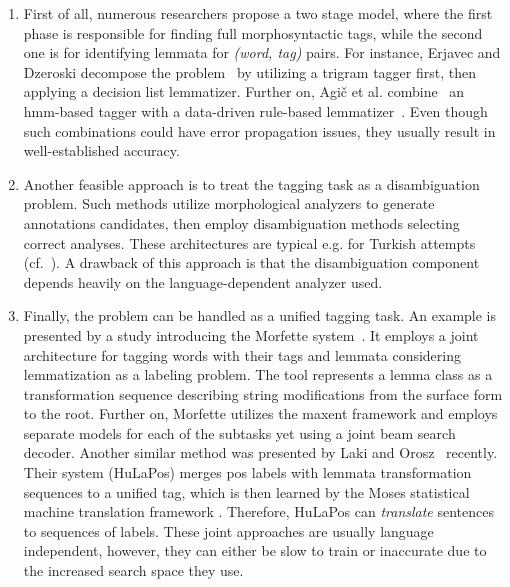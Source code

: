 \begin{enumerate}
  \item First of all, numerous researchers propose a two stage model, where the first phase is responsible for finding full morphosyntactic tags, while the second one is for identifying lemmata for \emph{(word, tag)} pairs. 
  For instance, Erjavec and Dzeroski decompose the problem~\cite{Erjavec2004} by utilizing a trigram  tagger first, then applying a decision list lemmatizer. \label{part:general-lemmatization}
  Further on, Agič et al. combine~\cite{Agic2013} an \acrshort{hmm}-based tagger with a data-driven rule-based lemmatizer~\cite{Jongejan}. 
  Even though such combinations could have error propagation issues, they usually result in well-established accuracy.
  \item Another feasible approach is to treat the tagging task as a disambiguation problem. 
  Such methods utilize morphological analyzers to generate annotations candidates, then employ disambiguation methods selecting correct analyses.
  These architectures are typical e.g. for Turkish attempts (cf.~\cite{Sak2007,Hakkani-Tur2002}).
  A drawback of this approach is that the disambiguation component depends heavily on the language-dependent analyzer used.
  \item Finally, the problem can be handled as a unified tagging task.
  An example is presented by a study introducing the Morfette system~\cite{Chrupaa2008}.
  It employs a joint architecture for tagging words with their tags and lemmata considering lemmatization as a labeling problem.
  The tool represents a lemma class as a transformation sequence describing string modifications from the surface form to the root.
  Further on, Morfette utilizes the \acrshort{maxent} framework and employs separate models for each of the subtasks yet using a joint beam search decoder.
  Another similar method was presented by Laki and Orosz~\cite{Laki2013} recently.
  Their system (HuLaPos) merges \gls{pos} labels with lemmata transformation sequences to a unified tag, which is then learned by the Moses statistical machine translation framework \cite{Koehn2007}.
  Therefore, HuLaPos can \emph{translate} sentences to sequences of labels.
  These joint approaches are usually language independent, however, they can either be slow to train or inaccurate due to the increased search space they use.
\end{enumerate}

